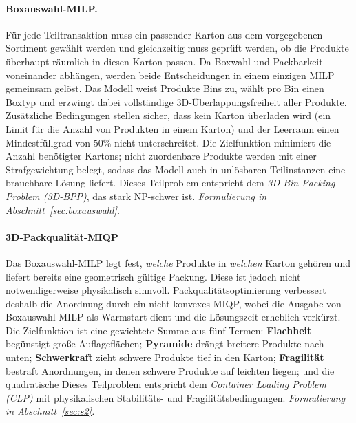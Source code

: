 \documentclass[10pt]{article}
\begin{document}
\paragraph{Boxauswahl-MILP.}
F\"ur jede Teiltransaktion muss ein passender Karton aus dem vorgegebenen
Sortiment gew\"ahlt werden und gleichzeitig muss
gepr\"uft werden, ob die Produkte \"uberhaupt r\"aumlich in diesen
Karton passen.
Da Boxwahl und Packbarkeit voneinander abh\"angen, werden beide
Entscheidungen in einem einzigen MILP gemeinsam gel\"ost.
Das Modell weist Produkte Bins zu, w\"ahlt pro Bin einen Boxtyp und
erzwingt dabei vollst\"andige 3D-\"Uberlappungsfreiheit aller
Produkte.
Zus\"atzliche Bedingungen stellen sicher, dass kein Karton \"uberladen
wird (ein Limit für die Anzahl von Produkten in einem Karton) und der Leerraum einen Mindestf\"ullgrad von $50\%$ nicht unterschreitet.
Die Zielfunktion minimiert die Anzahl ben\"otigter Kartons; nicht
zuordenbare Produkte werden mit einer Strafgewichtung belegt,
sodass das Modell auch in unl\"osbaren Teilinstanzen eine
brauchbare L\"osung liefert.
Dieses Teilproblem entspricht dem \emph{3D Bin Packing Problem (3D-BPP)},
das stark NP-schwer ist.
\emph{Formulierung in Abschnitt~\ref{sec:boxauswahl}.}


\paragraph{3D-Packqualität-MIQP}
Das Boxauswahl-MILP legt fest, \emph{welche} Produkte in \emph{welchen}
Karton geh\"oren und liefert bereits eine geometrisch g\"ultige
Packung. Diese ist jedoch nicht notwendigerweise physikalisch
sinnvoll.
Packqualit\"atsoptimierung verbessert deshalb die Anordnung durch ein nicht-konvexes
MIQP, wobei die Ausgabe von
Boxauswahl-MILP als Warmstart dient und die L\"osungszeit erheblich
verk\"urzt.
Die Zielfunktion ist eine gewichtete Summe aus f\"unf Termen:
\textbf{Flachheit} beg\"unstigt gro\ss e Auflagefl\"achen;
\textbf{Pyramide} dr\"angt breitere Produkte nach unten;
\textbf{Schwerkraft} zieht schwere Produkte tief in den Karton;
\textbf{Fragilit\"at} bestraft Anordnungen, in denen schwere Produkte
auf leichten liegen; und die quadratische
Dieses Teilproblem entspricht dem \emph{Container Loading Problem (CLP)}
mit physikalischen Stabilit\"ats- und Fragilit\"atsbedingungen.
\emph{Formulierung in Abschnitt~\ref{sec:s2}.}
\end{document}
